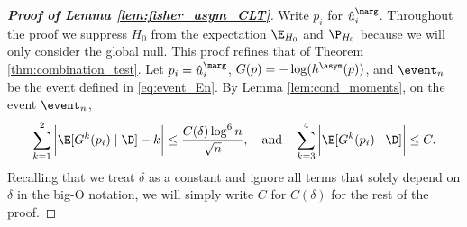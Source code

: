 \begin{proof}[\textbf{Proof of Lemma \ref{lem:fisher_asym_CLT}}]
Write $p_i$ for $\hat{u}^\marg_i$. Throughout the proof we suppress $H_0$ from the expectation $\E_{H_0}$ and $\P_{H_0}$ because we will only consider the global null. This proof refines that of Theorem \ref{thm:combination_test}. Let $p_i = \hat{u}_i^\marg$, $G(p) = -\log(h^\asym(p))$, and $\event_{n}$ be the event defined in \eqref{eq:event_En}. By Lemma \ref{lem:cond_moments}, on the event $\event_n$,
\[\sum_{k=1}^{2}\bigg|\E[G^k(p_i)\mid \D] - k\bigg| \le \frac{C(\delta)\log^6 n}{\sqrt{n}}, \quad \text{and}\quad \sum_{k=3}^{4}\bigg|\E[G^k(p_i)\mid \D]\bigg| \le C.\]
Recalling that we treat $\delta$ as a constant and ignore all terms that solely depend on $\delta$ in the big-O notation, we will simply write $C$ for $C(\delta)$ for the rest of the proof.


\end{proof}
